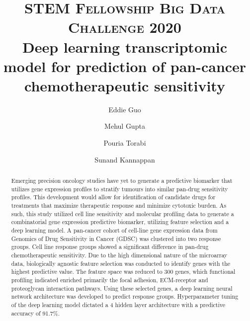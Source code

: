 \documentclass[10pt, letterpaper]{article}
\title{
    \usefont{OT1}{bch}{b}{n}
    \normalfont \normalsize \textsc{STEM Fellowship Big Data Challenge 2020} \\ [10pt]
    \huge Deep learning transcriptomic model for prediction of pan-cancer chemotherapeutic sensitivity \\
}
\author[1]{Eddie Guo}
\author[2]{Mehul Gupta}
\author[1]{Pouria Torabi}
\author[2]{Sunand Kannappan}
\affil[1]{University of Alberta}
\affil[2]{University of Calgary}
\begin{document}
\maketitle


\begin{abstract}
	Emerging precision oncology studies have yet to generate a predictive biomarker that utilizes gene expression profiles to stratify tumours into similar pan-drug sensitivity profiles. This development would allow for identification of candidate drugs for treatments that maximize therapeutic response and minimize cytotoxic burden. As such, this study utilized cell line sensitivity and molecular profiling data to generate a combinatorial gene expression predictive biomarker, utilizing feature selection and a deep learning model. A pan-cancer cohort of cell-line gene expression data from Genomics of Drug Sensitivity in Cancer (GDSC) was clustered into two response groups. Cell line response groups showed a significant difference in pan-drug chemotherapeutic sensitivity. Due to the high dimensional nature of the microarray data, biologically agnostic feature selection was conducted to identify genes with the highest predictive value. The feature space was reduced to 300 genes, which functional profiling indicated enriched primarily the focal adhesion, ECM-receptor and proteoglycan interaction pathways. Using these selected genes, a deep learning neural network architecture was developed to predict response groups. Hyperparameter tuning of the deep learning model dictated a 4 hidden layer architecture with a predictive accuracy of 91.7\%. \vspace{1em}

\end{abstract} \vspace{1em}
\end{document}

